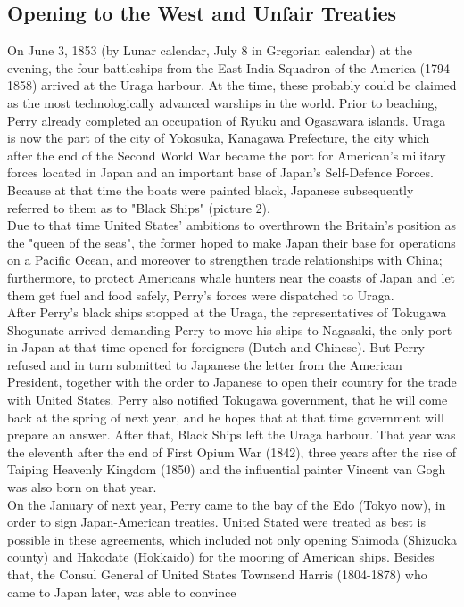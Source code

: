 \documentclass[11pt]{book}
\begin{document}
\subsection{Opening to the West and Unfair Treaties}
On June 3, 1853 (by Lunar calendar, July 8 in Gregorian calendar) at the evening, the four battleships from the East India Squadron of the America
(1794-1858) arrived at the Uraga harbour. At the time, these probably could be claimed as the most technologically advanced warships in the world. 
Prior to beaching, Perry already completed an occupation of Ryuku and Ogasawara islands. Uraga is now the part of the city of Yokosuka,
Kanagawa Prefecture, the city which after the end of the Second World War became the port for American's military forces located in Japan and
an important base of Japan's Self-Defence Forces. Because at that time the boats were painted black, Japanese subsequently referred to them
as to "Black Ships" (picture 2).\\
Due to that time United States' ambitions to overthrown the Britain's position as the "queen of the seas", the former hoped to make Japan
their base for operations on a Pacific Ocean, and moreover to strengthen trade relationships with China; furthermore, to protect Americans
whale hunters near the coasts of Japan and let them get fuel and food safely, Perry's forces were dispatched to Uraga.\\
After Perry's black ships stopped at the Uraga, the representatives of Tokugawa Shogunate arrived demanding Perry to move his ships to Nagasaki, the
only port in Japan at that time opened for foreigners (Dutch and Chinese). But Perry refused and in turn submitted to Japanese the letter from
the American President, together with the order to Japanese to open their country for the trade with United States. Perry also notified
Tokugawa government, that he will come back at the spring of next year, and he hopes that at that time government will prepare an answer. After that,
Black Ships left the Uraga harbour. That year was the eleventh after the end of First Opium War (1842), three years after the rise of Taiping
Heavenly Kingdom (1850) and the influential painter Vincent van Gogh was also born on that year.\\
On the January of next year, Perry came to the bay of the Edo (Tokyo now), in order to sign Japan-American treaties. United Stated were treated
as best is possible in these agreements, which included not only opening Shimoda (Shizuoka county) and Hakodate (Hokkaido) for the mooring of
American ships. Besides that, the Consul General of United States Townsend Harris (1804-1878) who came to Japan later, was able to convince
\end{document}
